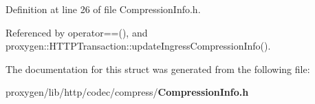 Definition at line 26 of file Compression\+Info.\+h.



Referenced by operator==(), and proxygen\+::\+H\+T\+T\+P\+Transaction\+::update\+Ingress\+Compression\+Info().



The documentation for this struct was generated from the following file\+:\begin{DoxyCompactItemize}
\item 
proxygen/lib/http/codec/compress/{\bf Compression\+Info.\+h}\end{DoxyCompactItemize}
